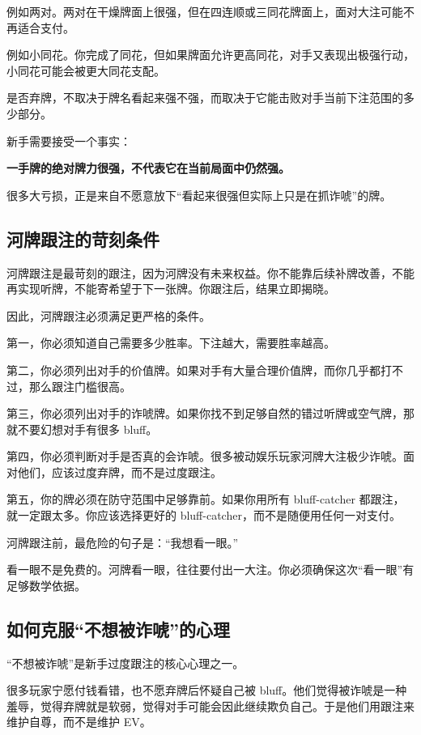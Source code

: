 例如两对。两对在干燥牌面上很强，但在四连顺或三同花牌面上，面对大注可能不再适合支付。

例如小同花。你完成了同花，但如果牌面允许更高同花，对手又表现出极强行动，小同花可能会被更大同花支配。

是否弃牌，不取决于牌名看起来强不强，而取决于它能击败对手当前下注范围的多少部分。

新手需要接受一个事实：

\begin{center}
\textbf{一手牌的绝对牌力很强，不代表它在当前局面中仍然强。}
\end{center}

很多大亏损，正是来自不愿意放下“看起来很强但实际上只是在抓诈唬”的牌。

\subsection{河牌跟注的苛刻条件}

河牌跟注是最苛刻的跟注，因为河牌没有未来权益。你不能靠后续补牌改善，不能再实现听牌，不能寄希望于下一张牌。你跟注后，结果立即揭晓。

因此，河牌跟注必须满足更严格的条件。

第一，你必须知道自己需要多少胜率。下注越大，需要胜率越高。

第二，你必须列出对手的价值牌。如果对手有大量合理价值牌，而你几乎都打不过，那么跟注门槛很高。

第三，你必须列出对手的诈唬牌。如果你找不到足够自然的错过听牌或空气牌，那就不要幻想对手有很多 bluff。

第四，你必须判断对手是否真的会诈唬。很多被动娱乐玩家河牌大注极少诈唬。面对他们，应该过度弃牌，而不是过度跟注。

第五，你的牌必须在防守范围中足够靠前。如果你用所有 bluff-catcher 都跟注，就一定跟太多。你应该选择更好的 bluff-catcher，而不是随便用任何一对支付。

河牌跟注前，最危险的句子是：“我想看一眼。”

看一眼不是免费的。河牌看一眼，往往要付出一大注。你必须确保这次“看一眼”有足够数学依据。

\subsection{如何克服“不想被诈唬”的心理}

“不想被诈唬”是新手过度跟注的核心心理之一。

很多玩家宁愿付钱看错，也不愿弃牌后怀疑自己被 bluff。他们觉得被诈唬是一种羞辱，觉得弃牌就是软弱，觉得对手可能会因此继续欺负自己。于是他们用跟注来维护自尊，而不是维护 EV。


